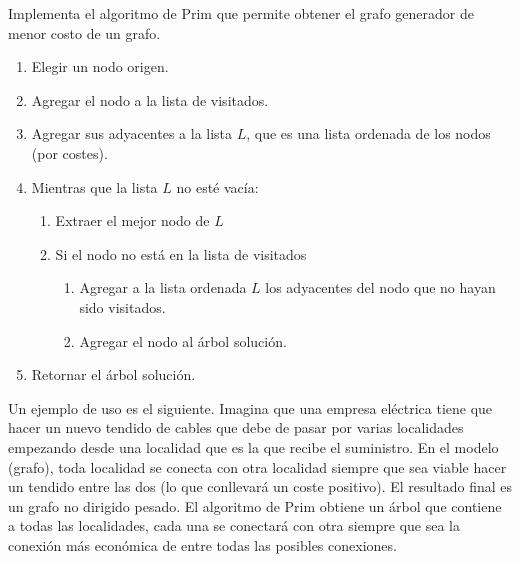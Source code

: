 Implementa el algoritmo de Prim que permite obtener el grafo generador de menor costo de un grafo.

\begin{enumerate}
\item Elegir un nodo origen.
\item Agregar el nodo a la lista de visitados.
\item Agregar sus adyacentes a la lista $L$, que es una lista ordenada de los nodos (por costes).
\item Mientras que la lista $L$ no esté vacía:
	\begin{enumerate}
	\item Extraer el mejor nodo de $L$
	\item Si el nodo no está en la lista de visitados
		\begin{enumerate}
		\item Agregar a la lista ordenada $L$ los adyacentes del nodo que no hayan sido visitados.
		\item Agregar el nodo al árbol solución.
		\end{enumerate}
	\end{enumerate}
\item Retornar el árbol solución.
\end{enumerate}


Un ejemplo de uso es el siguiente. Imagina que una empresa eléctrica tiene que hacer un nuevo tendido de cables que debe de pasar por varias localidades empezando desde una localidad que es la que recibe el suministro. En el modelo (grafo), toda localidad se conecta con otra localidad siempre que sea viable hacer un tendido entre las dos (lo que conllevará un coste positivo). El resultado final es un grafo no dirigido pesado. El algoritmo de Prim obtiene un árbol que contiene a todas las localidades, cada una se conectará con otra siempre que sea la conexión más económica de entre todas las posibles conexiones.


%










\separacion


